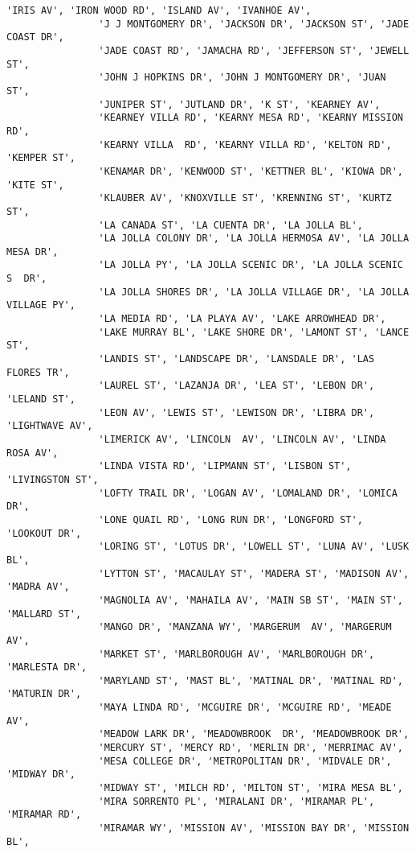 \documentclass[11pt]{article}
\begin{document}
\begin{Verbatim}[commandchars=\\\{\}]
                'IRIS AV', 'IRON WOOD RD', 'ISLAND AV', 'IVANHOE AV',
                'J J MONTGOMERY DR', 'JACKSON DR', 'JACKSON ST', 'JADE COAST DR',
                'JADE COAST RD', 'JAMACHA RD', 'JEFFERSON ST', 'JEWELL ST',
                'JOHN J HOPKINS DR', 'JOHN J MONTGOMERY DR', 'JUAN ST',
                'JUNIPER ST', 'JUTLAND DR', 'K ST', 'KEARNEY AV',
                'KEARNEY VILLA RD', 'KEARNY MESA RD', 'KEARNY MISSION RD',
                'KEARNY VILLA  RD', 'KEARNY VILLA RD', 'KELTON RD', 'KEMPER ST',
                'KENAMAR DR', 'KENWOOD ST', 'KETTNER BL', 'KIOWA DR', 'KITE ST',
                'KLAUBER AV', 'KNOXVILLE ST', 'KRENNING ST', 'KURTZ ST',
                'LA CANADA ST', 'LA CUENTA DR', 'LA JOLLA BL',
                'LA JOLLA COLONY DR', 'LA JOLLA HERMOSA AV', 'LA JOLLA MESA DR',
                'LA JOLLA PY', 'LA JOLLA SCENIC DR', 'LA JOLLA SCENIC S  DR',
                'LA JOLLA SHORES DR', 'LA JOLLA VILLAGE DR', 'LA JOLLA VILLAGE PY',
                'LA MEDIA RD', 'LA PLAYA AV', 'LAKE ARROWHEAD DR',
                'LAKE MURRAY BL', 'LAKE SHORE DR', 'LAMONT ST', 'LANCE ST',
                'LANDIS ST', 'LANDSCAPE DR', 'LANSDALE DR', 'LAS FLORES TR',
                'LAUREL ST', 'LAZANJA DR', 'LEA ST', 'LEBON DR', 'LELAND ST',
                'LEON AV', 'LEWIS ST', 'LEWISON DR', 'LIBRA DR', 'LIGHTWAVE AV',
                'LIMERICK AV', 'LINCOLN  AV', 'LINCOLN AV', 'LINDA ROSA AV',
                'LINDA VISTA RD', 'LIPMANN ST', 'LISBON ST', 'LIVINGSTON ST',
                'LOFTY TRAIL DR', 'LOGAN AV', 'LOMALAND DR', 'LOMICA DR',
                'LONE QUAIL RD', 'LONG RUN DR', 'LONGFORD ST', 'LOOKOUT DR',
                'LORING ST', 'LOTUS DR', 'LOWELL ST', 'LUNA AV', 'LUSK BL',
                'LYTTON ST', 'MACAULAY ST', 'MADERA ST', 'MADISON AV', 'MADRA AV',
                'MAGNOLIA AV', 'MAHAILA AV', 'MAIN SB ST', 'MAIN ST', 'MALLARD ST',
                'MANGO DR', 'MANZANA WY', 'MARGERUM  AV', 'MARGERUM AV',
                'MARKET ST', 'MARLBOROUGH AV', 'MARLBOROUGH DR', 'MARLESTA DR',
                'MARYLAND ST', 'MAST BL', 'MATINAL DR', 'MATINAL RD', 'MATURIN DR',
                'MAYA LINDA RD', 'MCGUIRE DR', 'MCGUIRE RD', 'MEADE AV',
                'MEADOW LARK DR', 'MEADOWBROOK  DR', 'MEADOWBROOK DR',
                'MERCURY ST', 'MERCY RD', 'MERLIN DR', 'MERRIMAC AV',
                'MESA COLLEGE DR', 'METROPOLITAN DR', 'MIDVALE DR', 'MIDWAY DR',
                'MIDWAY ST', 'MILCH RD', 'MILTON ST', 'MIRA MESA BL',
                'MIRA SORRENTO PL', 'MIRALANI DR', 'MIRAMAR PL', 'MIRAMAR RD',
                'MIRAMAR WY', 'MISSION AV', 'MISSION BAY DR', 'MISSION BL',

\end{Verbatim}
\end{document}
